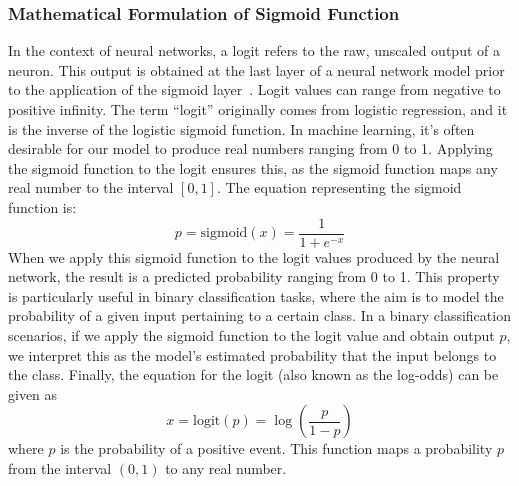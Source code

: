 \subsubsection{Mathematical Formulation of Sigmoid Function}
In the context of neural networks, a logit refers to the raw, unscaled output of a neuron. This output is obtained at the last layer of a neural network model prior to the application of the sigmoid layer~\cite{furnieles_Sigmoid_2022}. Logit values can range from negative to positive infinity. The term ``logit'' originally comes from logistic regression, and it is the inverse of the logistic sigmoid function. In machine learning, it's often desirable for our model to produce real numbers ranging from 0 to 1. Applying the sigmoid function to the logit ensures this, as the sigmoid function maps any real number to the interval \([0,1]\).
The equation representing the sigmoid function is:
\begin{equation}
p = \text{{sigmoid}}(x) = \frac{1}{1 + e^{-x}}
\end{equation}
When we apply this sigmoid function to the logit values produced by the neural network, the result is a predicted probability ranging from 0 to 1. This property is particularly useful in binary classification tasks, where the aim is to model the probability of a given input pertaining to a certain class.
In a binary classification scenarios, if we apply the sigmoid function to the logit value and obtain output \( p \), we interpret this as the model's estimated probability that the input belongs to the class.
Finally, the equation for the logit (also known as the log-odds) can be given as
\begin{equation}
x = \text{{logit}}(p) = \log \left( \frac{p}{1 - p} \right)
\end{equation}
where \( p \) is the probability of a positive event. This function maps a probability \( p \) from the interval \((0,1)\) to any real number.
%

